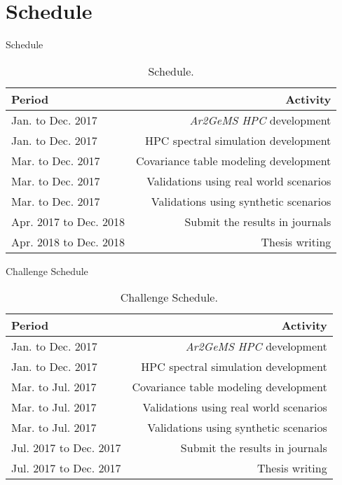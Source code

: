 \section{Schedule}
\begin{frame}{Schedule}

\centering
\begin{table}
\centering
\begin{tabular}{l|r}
Period & Activity \\\hline
Jan. to Dec. 2017 & \textit{Ar2GeMS HPC} development \\
Jan. to Dec. 2017 & HPC spectral simulation development \\
Mar. to Dec. 2017 & Covariance table modeling development \\
Mar. to Dec. 2017 & Validations using real world scenarios \\
Mar. to Dec. 2017 & Validations using synthetic scenarios \\
Apr. 2017 to Dec. 2018 & Submit the results in journals  \\
Apr. 2018 to Dec. 2018 & Thesis writing 
\end{tabular}
\caption{\label{tab:widgets}Schedule.}
\end{table}


\end{frame}


\begin{frame}{Challenge Schedule}

\centering
\begin{table}
\centering
\begin{tabular}{l|r}
Period & Activity \\\hline
Jan. to Dec. 2017 & \textit{Ar2GeMS HPC} development \\
Jan. to Dec. 2017 & HPC spectral simulation development \\
Mar. to Jul. 2017 & Covariance table modeling development \\
Mar. to Jul. 2017 & Validations using real world scenarios \\
Mar. to Jul. 2017 & Validations using synthetic scenarios \\
Jul. 2017 to Dec. 2017 & Submit the results in journals  \\
Jul. 2017 to Dec. 2017 & Thesis writing 
\end{tabular}
\caption{\label{tab:widgets}Challenge Schedule.}
\end{table}


\end{frame}